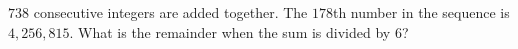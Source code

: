 $738$ consecutive integers are added together. The $178$th number in the sequence is $4{,}256{,}815$. What is the remainder when the sum is divided by $6$?
